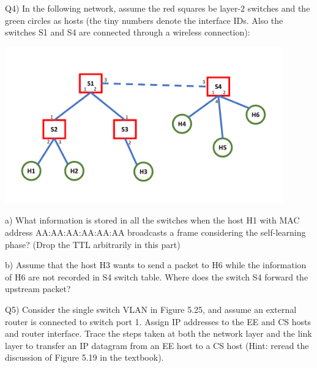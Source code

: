 \documentclass[10pt,letterpaper]{article}
\begin{document}
Q4) In the following network, assume the red squares be layer-2 switches and the green circles as hosts (the tiny numbers denote the interface IDs. Also the switches S1 and S4 are connected through a wireless connection):
\begin{center}
\includegraphics[width=120mm]{Q5_HW8}
\end{center}
a) What information is stored in all the switches when the host H1 with MAC address AA:AA:AA:AA:AA:AA broadcasts a frame considering the self-learning phase? (Drop the TTL arbitrarily in this part)

b) Assume that the host H3 wants to send a packet to H6 while the information of H6 are not recorded in S4 switch table. Where does the switch S4 forward the upstream packet?

Q5) Consider the single switch VLAN in Figure 5.25, and assume an external
router is connected to switch port 1. Assign IP addresses to the EE and CS
hosts and router interface. Trace the steps taken at both the network layer and the link layer to transfer an IP datagram from an EE host to a CS host (Hint: reread the discussion of Figure 5.19 in the textbook).
\end{document}
